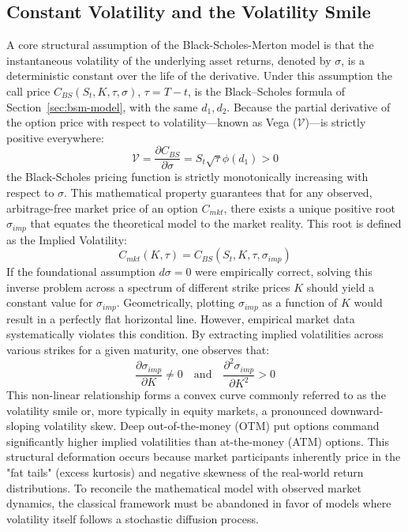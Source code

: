 \subsection{Constant Volatility and the Volatility Smile}
\label{sec:constant-vol-smile}
A core structural assumption of the Black-Scholes-Merton model is that the instantaneous volatility of the underlying asset returns, denoted by $\sigma$, is a deterministic constant over the life of the derivative. Under this assumption the call price $C_{BS}(S_t,K,\tau,\sigma)$, $\tau=T-t$, is the Black--Scholes formula of Section~\ref{sec:bsm-model}, with the same $d_1,d_2$.
Because the partial derivative of the option price with respect to volatility—known as Vega ($\mathcal{V}$)—is strictly positive everywhere:$$\mathcal{V} = \frac{\partial C_{BS}}{\partial \sigma} = S_t \sqrt{\tau} \phi(d_1) > 0$$the Black-Scholes pricing function is strictly monotonically increasing with respect to $\sigma$. This mathematical property guarantees that for any observed, arbitrage-free market price of an option $C_{mkt}$, there exists a unique positive root $\sigma_{imp}$ that equates the theoretical model to the market reality. This root is defined as the Implied Volatility:
$$C_{mkt}(K, \tau) = C_{BS}(S_t, K, \tau, \sigma_{imp})$$
If the foundational assumption $d\sigma = 0$ were empirically correct, solving this inverse problem across a spectrum of different strike prices $K$ should yield a constant value for $\sigma_{imp}$. Geometrically, plotting $\sigma_{imp}$ as a function of $K$ would result in a perfectly flat horizontal line. However, empirical market data systematically violates this condition. By extracting implied volatilities across various strikes for a given maturity, one observes that:
$$\frac{\partial \sigma_{imp}}{\partial K} \neq 0 \quad \text{and} \quad \frac{\partial^2 \sigma_{imp}}{\partial K^2} > 0$$
This non-linear relationship forms a convex curve commonly referred to as the volatility smile or, more typically in equity markets, a pronounced downward-sloping volatility skew. Deep out-of-the-money (OTM) put options command significantly higher implied volatilities than at-the-money (ATM) options. This structural deformation occurs because market participants inherently price in the "fat tails" (excess kurtosis) and negative skewness of the real-world return distributions. To reconcile the mathematical model with observed market dynamics, the classical framework must be abandoned in favor of models where volatility itself follows a stochastic diffusion process.


